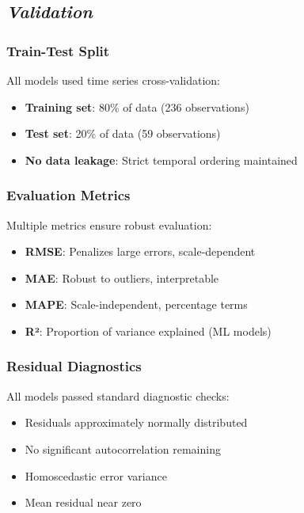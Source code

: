 \documentclass[12pt]{article}
\begin{document}
\subsection*{\textit{Validation}}

\subsubsection*{Train-Test Split}

All models used time series cross-validation:
\begin{itemize}
    \item \textbf{Training set}: 80\% of data (236 observations)
    \item \textbf{Test set}: 20\% of data (59 observations)
    \item \textbf{No data leakage}: Strict temporal ordering maintained
\end{itemize}

\subsubsection*{Evaluation Metrics}

Multiple metrics ensure robust evaluation:
\begin{itemize}
    \item \textbf{RMSE}: Penalizes large errors, scale-dependent
    \item \textbf{MAE}: Robust to outliers, interpretable
    \item \textbf{MAPE}: Scale-independent, percentage terms
    \item \textbf{R²}: Proportion of variance explained (ML models)
\end{itemize}

\subsubsection*{Residual Diagnostics}

All models passed standard diagnostic checks:
\begin{itemize}
    \item Residuals approximately normally distributed
    \item No significant autocorrelation remaining
    \item Homoscedastic error variance
    \item Mean residual near zero
\end{itemize}
\end{document}
